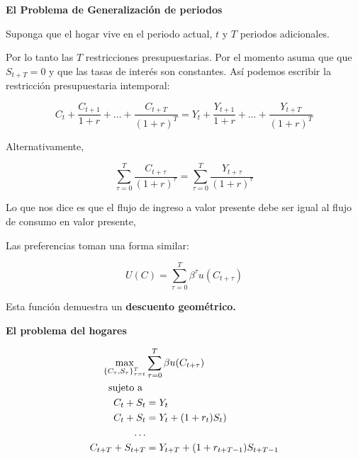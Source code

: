
\textbf{El Problema de Generalización de periodos}

Suponga que el hogar vive en el periodo actual, $t$ y $T$ periodos adicionales.

Por lo tanto las $T$ restricciones presupuestarias. Por el momento asuma que que $S_{t+T}=0$ y que las tasas de interés son constantes. Así podemos escribir la restricción presupuestaria intemporal:

\begin{equation}
    C_{t}+\frac{C_{t+1}}{1+r}+\dots+\frac{C_{t+T}}{(1+r)^{T}}=Y_{t}+\frac{Y_{t+1}}{1+r}+\dots+\frac{Y_{t+T}}{(1+r)^{T}}
\end{equation}

Alternativamente, 

\begin{equation}
    \sum_{\tau=0}^{T} \frac{C_{t+\tau}}{(1+r)^{\tau}} =  \sum_{\tau=0}^{T} \frac{Y_{t+\tau}}{(1+r)^{\tau}}
\end{equation}

Lo que nos dice es que el flujo de ingreso a valor presente debe ser igual al flujo de consumo en valor presente,

Las preferencias toman una forma similar: 

\begin{equation}
    U(C)=\sum_{\tau =0}^{T}\beta^{\tau}u(C_{t+\tau})
\end{equation}

Esta función demuestra un \textbf{descuento geométrico.}

\textbf{El problema del hogares}

\begin{align}
    \max_{\{C_{\tau}, S_{\tau}\}^{T}_{\tau=t}} & \sum_{\tau =0 }^{T}\beta u(C_{t+\tau}) \\
    \textup{sujeto a }\nonumber \\
    C_{t}+S_{t}&=Y_{t}\\
    C_{t}+S_{t}&=Y_{t}+(1+r_{t}) S_{t})\\
    \dots \nonumber \\
    C_{t+T}+S_{t+T}&=Y_{t+T}+(1+r_{t+T-1}) S_{t+T-1}
\end{align}